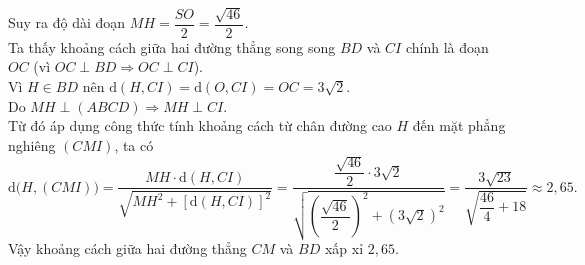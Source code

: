 \begin{ex}
{			Suy ra độ dài đoạn $MH = \dfrac{SO}{2} = \dfrac{\sqrt{46}}{2}$.\\[3pt]
			Ta thấy khoảng cách giữa hai đường thẳng song song $BD$ và $CI$ chính là đoạn $OC$ (vì $OC \perp BD \Rightarrow OC \perp CI$).\\
			Vì $H \in BD$ nên $\mathrm{d}(H, CI) = \mathrm{d}(O, CI) = OC = 3\sqrt{2}$.\\[3pt]
			Do $MH \perp (ABCD) \Rightarrow MH \perp CI$.\\ 
			Từ đó áp dụng công thức tính khoảng cách từ chân đường cao $H$ đến mặt phẳng nghiêng $(CMI)$, ta có
			\[
			\mathrm{d}\big(H, (CMI)\big) = \dfrac{MH \cdot \mathrm{d}(H, CI)}{\sqrt{MH^2 + \left[\mathrm{d}(H, CI)\right]^2}} = \dfrac{\dfrac{\sqrt{46}}{2} \cdot 3\sqrt{2}}{\sqrt{\left(\dfrac{\sqrt{46}}{2}\right)^2 + \left(3\sqrt{2}\right)^2}} = \dfrac{3\sqrt{23}}{\sqrt{\dfrac{46}{4} + 18}} \approx 2{,}65.\]
			Vậy khoảng cách giữa hai đường thẳng $CM$ và $BD$ xấp xỉ $2{,}65$.
	}
\end{ex}

